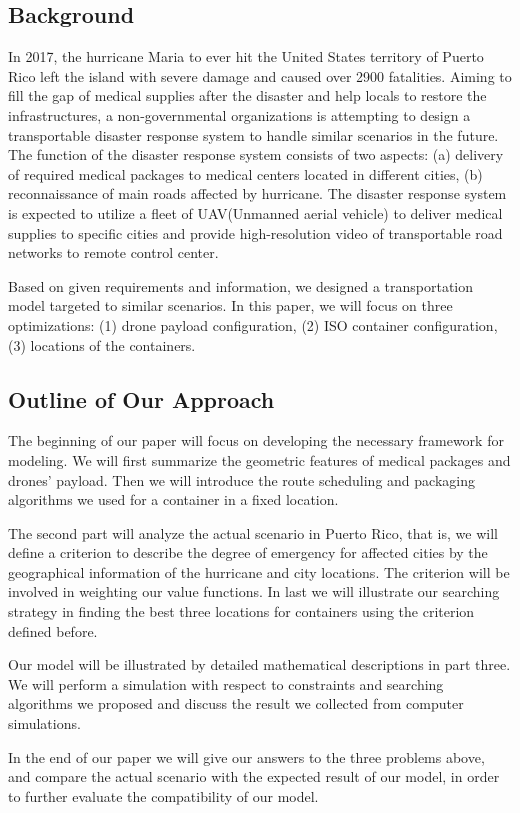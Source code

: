 \documentclass[12pt]{article}
\begin{document}
		\subsection{Background}
		In 2017, the hurricane Maria to ever hit the United States territory of Puerto Rico left the island with severe damage and caused over 2900 fatalities. Aiming to fill the gap of medical supplies after the disaster and help locals to restore the infrastructures, a non-governmental organizations is attempting to design a transportable disaster response system to handle similar scenarios in the future. The function of the disaster response system consists of two aspects: (a) delivery of required medical packages to medical centers located in different cities, (b) reconnaissance of main roads affected by hurricane. The disaster response system is expected to utilize a fleet of UAV(Unmanned aerial vehicle) to deliver medical supplies to specific cities and provide high-resolution video of transportable road networks to remote control center. \par 
		Based on given requirements and information, we designed a transportation model targeted to similar scenarios. In this paper, we will focus on three optimizations: (1) drone payload configuration, (2) ISO container configuration, (3) locations of the containers. \par 
		
		\subsection{Outline of Our Approach}
		The beginning of our paper will focus on developing the necessary framework for modeling. We will first summarize the geometric features of medical packages and drones' payload. Then we will introduce the route scheduling and packaging algorithms we used for a container in a fixed location. \par 
		The second part will analyze the actual scenario in Puerto Rico, that is, we will define a criterion to describe the degree of emergency for affected cities by the geographical information of the hurricane and city locations. The criterion will be involved in weighting our value functions. In last we will illustrate our searching strategy in finding the best three locations for containers using the criterion defined before.\par 
		Our model will be illustrated by detailed mathematical descriptions in part three. We will perform a simulation with respect to constraints and searching algorithms we proposed and discuss the result we collected from computer simulations.\par 
		In the end of our paper we will give our answers to the three problems above, and compare the actual scenario with the expected result of our model, in order to further evaluate the compatibility of our model. \par    
		
\end{document}
